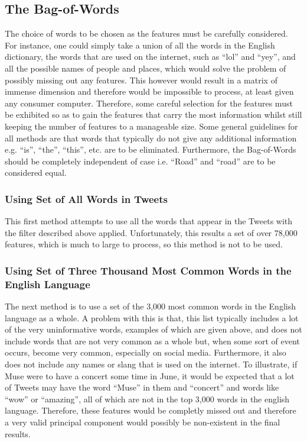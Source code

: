 \documentclass[11pt,a4paper]{article}
\begin{document}
\subsection{The Bag-of-Words}
The choice of words to be chosen as the features must be carefully considered. For instance, one could simply take a union of all the words in the English dictionary, the words that are used on the internet, such as ``lol'' and ``yey'', and all the possible names of people and places, which would solve the problem of possibly missing out any features. This however would result in a matrix of immense dimension and therefore would be impossible to process, at least given any consumer computer. Therefore, some careful selection for the features must be exhibited so as to gain the features that carry the most information whilst still keeping the number of features to a manageable size. Some general guidelines for all methods are that words that typically do not give any additional information e.g. ``is'', ``the'', ``this'', etc. are to be eliminated. Furthermore, the Bag-of-Words should be completely independent of case i.e. ``Road'' and ``road'' are to be considered equal. 

\subsubsection{Using Set of All Words in Tweets}
This first method attempts to use all the words that appear in the Tweets with the filter described above applied. Unfortunately, this results a set of over 78,000 features, which is much to large to process, so this method is not to be used. 

\subsubsection{Using Set of Three Thousand Most Common Words in the English Language}
The next method is to use a set of the 3,000 most common words in the English language as a whole. A problem with this is that, this list typically includes a lot of the very uninformative words, examples of which are given above, and does not include words that are not very common as a whole but, when some sort of event occurs, become very common, especially on social media. Furthermore, it also does not include any names or slang that is used on the internet. To illustrate, if Muse were to have a concert some time in June, it would be expected that a lot of Tweets may have the word ``Muse'' in them and ``concert'' and words like ``wow'' or ``amazing'', all of which are not in the top 3,000 words in the english language. Therefore, these features would be completly missed out and therefore a very valid principal component would possibly be non-existent in the final results.
\end{document}
